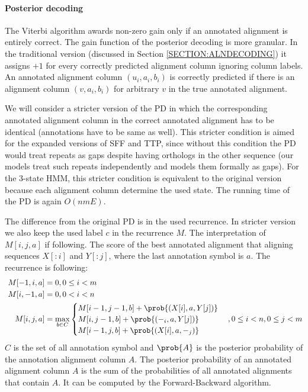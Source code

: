 \paragraph{Posterior decoding}
The Viterbi algorithm awards non-zero gain only if an annotated alignment is
entirely correct. The gain function of the posterior decoding is more granular.
In the traditional version (discussed in Section \ref{SECTION:ALNDECODING}) it
assigns $+1$ for every correctly predicted alignment column ignoring column
labels. An annotated alignment column $(u_i, a_i, b_i)$ is correctly predicted
if there is an alignment column $(v, a_i, b_i)$ for arbitrary $v$ in the true
annotated alignment. 

We will consider a stricter version of the PD in which the corresponding
annotated alignment column in the correct annotated alignment has to be
identical (annotations have to be same as well). This stricter condition is
aimed for the expanded versions of SFF and TTP, since without this condition
the PD would treat repeats as gaps despite having orthologs in the other
sequence (our models treat such repeats independently and models them formally
as gaps). For the 3-state HMM, this stricter condition is equivalent to the
original version because each alignment column determine the used state.
The running time of the PD is again $O(nmE)$. 

The difference from the original PD is in the used recurrence. In stricter
version we also keep the used label $c$ in the recurrence $M$. The
interpretation of $M[i,j,a]$ if following.  The score of the best annotated
alignment that aligning sequences $X[:i]$ and $Y[:j]$, where the last
annotation symbol is $a$. The recurrence is following:
\begin{align} 
M[-1,i,a] &= 0, 0\leq i < m\\\
M[i,-1,a] &= 0, 0< i < n\\
M[i,j,a] &= \max_{b\in C}
\begin{cases}
 M[i-1,j-1,b]+\prob{(X[i],a, Y[j])}\\
 M[i,j-1,b]+\prob{(-_{i},a, Y[j])}\\
 M[i-1,j,b]+\prob{(X[i],a, -_{j})}
\end{cases}, 0\leq i<n,0\leq j<m 
\end{align}
$C$ is the set of all annotation symbol and $\prob{A}$ is the posterior
probability of the annotation alignment column $A$. The posterior probability
of an annotated alignment column $A$ is the sum of the probabilities of all
annotated alignments that contain $A$. It can be computed by the
Forward-Backward algorithm.

